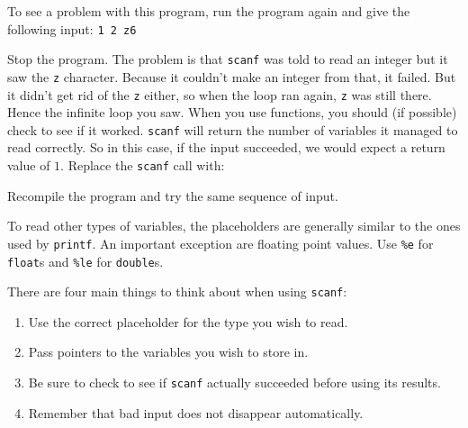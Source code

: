 To see a problem with this program, run the program again and give the following input:
\texttt{1 2 z6}

Stop the program.
The problem is that \texttt{scanf} was told to read an integer but it saw the \texttt{z} character.
Because it couldn't make an integer from that, it failed.
But it didn't get rid of the \texttt{z} either, so when the loop ran again, \texttt{z} was still there.
Hence the infinite loop you saw.
When you use functions, you should (if possible) check to see if it worked.
\texttt{scanf} will return the number of variables it managed to read correctly.
So in this case, if the input succeeded, we would expect a return value of $1$.
Replace the \texttt{scanf} call with:

Recompile the program and try the same sequence of input.

To read other types of variables, the placeholders are generally similar to the ones used by \texttt{printf}.
An important exception are floating point values.
Use \texttt{\%e} for \texttt{float}s and \texttt{\%le} for \texttt{double}s.


There are four main things to think about when using \texttt{scanf}:
\begin{enumerate}
 \item Use the correct placeholder for the type you wish to read.
 \item Pass pointers to the variables you wish to store in.
 \item Be sure to check to see if \texttt{scanf} actually succeeded
 before using its results.
 \item Remember that bad input does not disappear automatically.
\end{enumerate}
